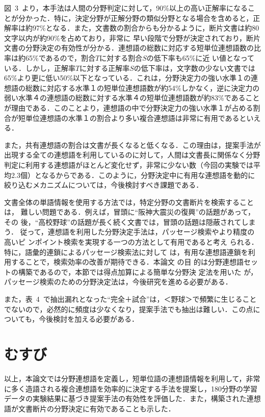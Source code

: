 図~3~より，本手法は人間の分野判定に対して，90\%以上の高い正解率になることが分かった．特に，決定分野が正解分野の類似分野となる場合を含めると，正解率は約97\%となる．また，文書数の割合からも分かるように，断片文書は約80文字以内が約90\%を占めており，非常に\break
早い段階で分野が決定されており，断片文書の分野決定の有効性が分かる．連想語の総数に対応する短単位連想語数の比率は約65\%であるので，割合$T$に対する割合$S$の低下率も65\%に近\break
い値となっている．しかし，正解率$T$に対する正解率$S$の低下率は，文字数の少ない文書では65\%より更に低い50\%以下となっている．これは，分野決定力の強い水準１の連想語の総数に対応する水準１の短単位連想語数が約54\%しかなく，逆に決定力の弱い水準４の連想語の総数に対する水準４の短単位連想語数が約83\%であることが理由である．このことより，連想語の中で分野決定力の強い水準１が占める割合が短単位連想語の水準１の割合より多い複合連想語は非常に有用であるといえる．

また，共有連想語の割合は文書が長くなると低くなる．この理由は，提案手法が出現する全ての連想語を利用しているのに対して，人間は文書長に関係なく分野判定に利用する連想語がほとんど変化せず，非常に少ない数（今回の実験では平均2.3個）となるからである．このように，分野決定中に有用な連想語を動的に絞り込むメカニズムについては，今後検討すべき課題である．

文書全体の単語情報を使用する方法では，特定分野の文書断片を検索することは，
難しい問題である．例えば，冒頭に``阪神大震災の復興''の話題があって，その
後，``高校野球''の話題が長く続く文書では，冒頭の話題は隠蔽されてしまう．
従って，連想語を利用した分野決定手法は，パッセージ検索やより精度の高いピ
ンポイント検索\cite{藤田1999}を実現する一つの方法として有用であると考え
られる．特に，語彙的連鎖によるパッセージ検索法\cite{望月他1999}に対して
は，有用な連想語連鎖を利用することで，検索効率の改善が期待できる．本論文
の目\break
的は分野連想語セットの構築であるので，本節では得点加算による簡単な分野決
定法を用いた
が，パッセージ検索のための分野決定法は，今後研究を進める必要がある．

また，表~4~で抽出漏れとなった``完全＋試合''は，＜野球＞で頻繁に生じることでないので，必然的に頻度は少なくなり，提案手法でも抽出は難しい．この点についても，今後検討を加える必要がある．

\vspace{-3mm}
\section{むすび}
\vspace{-1mm}

以上，本論文では分野連想語を定義し，短単位語の連想語情報を利用して，非常に多く造語される複合連想語を効率的に決定する手法を提案し，180分野の学習データの実験結果に基づき提案手法の有効性を評価した．また，構築された連想語が文書断片の分野決定に有効であることも示した．

